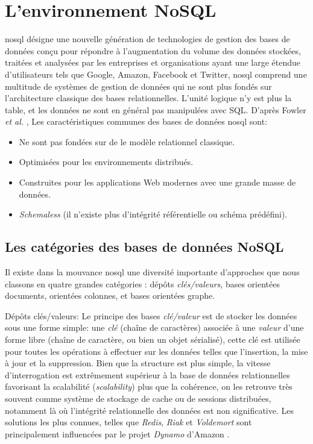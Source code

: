 \section{L'environnement NoSQL}
\label{sec:nosql}
\acrshort{nosql} désigne une nouvelle génération de technologies de
gestion des bases de données conçu pour répondre à l'augmentation du
volume des données stockées, traitées et analysées par les entreprises
et organisations ayant une large étendue d'utilisateurs tels que
Google, Amazon, Facebook et Twitter, \acrshort{nosql} comprend une
multitude de systèmes de gestion de données qui ne sont plus fondés
sur l'architecture classique des bases relationnelles. L'unité logique
n'y est plus la table, et les données ne sont en général pas
manipulées avec \textsc{SQL}.  D'après Fowler \textit{et al.}
\cite{sadalage2012nosql}, Les caractéristiques communes des bases de
données \acrshort{nosql} sont:

\begin{itemize}\renewcommand\labelitemi{--}
\item Ne sont pas fondées sur de le modèle relationnel classique.
\item Optimisées pour les environnements distribués.
\item Construites pour les applications Web modernes avec une grande
  masse de données.
\item \emph{Schemaless} (il n'existe plus d'intégrité référentielle ou
  schéma prédéfini).
\end{itemize}

  \subsection{Les catégories des bases de données NoSQL}
  \label{sec:cat-nosql}
  Il existe dans la mouvance \acrshort{nosql} une diversité importante
  d'approches que nous classons en quatre grandes catégories
  \cite{sadalage2012nosql}: dépôts \textit {clés/valeurs}, bases
  orientées documents, orientées colonnes, et bases orientées
  graphe.\bigskip

  \textsf{Dépôts clés/valeurs}: Le principe des bases
  \textit{clé/valeur} est de stocker les données sous une forme
  simple: une \emph{clé } (chaîne de caractères) associée à une
  \emph{valeur} d'une forme libre (chaîne de caractère, ou bien un
  objet sérialisé), cette clé est utilisée pour toutes les opérations
  à effectuer sur les données telles que l'insertion, la mise à jour
  et la suppression. Bien que la structure est plus simple, la vitesse
  d'interrogation est extrêmement supérieur à la base de données
  relationnelles favorisant la scalabilité (\emph{scalability}) plus
  que la cohérence, on les retrouve très souvent comme système de
  stockage de cache ou de sessions distribuées, notamment là où
  l'intégrité relationnelle des données est non significative. Les
  solutions les plus connues, telles que \emph{Redis}, \emph{Riak} et
  \emph{Voldemort} sont principalement influencées par le projet
  \emph{Dynamo} d'Amazon \cite{decandia2007dynamo}.\bigskip


